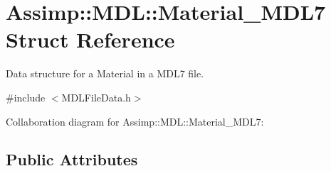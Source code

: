 \hypertarget{struct_assimp_1_1_m_d_l_1_1_material___m_d_l7}{\section{Assimp\+:\+:M\+D\+L\+:\+:Material\+\_\+\+M\+D\+L7 Struct Reference}
\label{struct_assimp_1_1_m_d_l_1_1_material___m_d_l7}
}


Data structure for a Material in a M\+D\+L7 file.  




{\ttfamily \#include $<$M\+D\+L\+File\+Data.\+h$>$}



Collaboration diagram for Assimp\+:\+:M\+D\+L\+:\+:Material\+\_\+\+M\+D\+L7\+:
\subsection*{Public Attributes}
